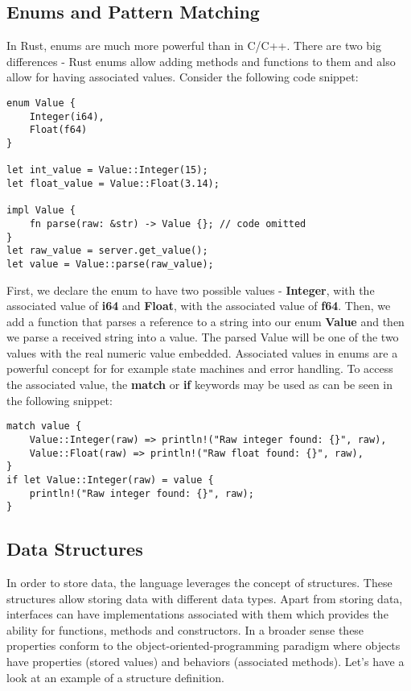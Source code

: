 \subsection{Enums and Pattern Matching}
\label{subsec:enum}
In Rust, enums are much more powerful than in C/C++.
There are two big differences - Rust enums allow adding methods and functions to them and also allow for having associated values.
Consider the following code snippet:

\begin{lstlisting}
enum Value {
    Integer(i64),
    Float(f64)
}

let int_value = Value::Integer(15);
let float_value = Value::Float(3.14);

impl Value {
    fn parse(raw: &str) -> Value {}; // code omitted
}
let raw_value = server.get_value();
let value = Value::parse(raw_value);
\end{lstlisting}

First, we declare the enum to have two possible values - \textbf{Integer}, with the associated value of \textbf{i64} and \textbf{Float}, with the associated value of \textbf{f64}.
Then, we add a function that parses a reference to a string into our enum \textbf{Value} and then we parse a received string into a value.
The parsed Value will be one of the two values with the real numeric value embedded.
Associated values in enums are a powerful concept for for example state machines and error handling.
To access the associated value, the \textbf{match} or \textbf{if} keywords may be used as can be seen in the following snippet:

\begin{lstlisting}
match value {
    Value::Integer(raw) => println!("Raw integer found: {}", raw),
    Value::Float(raw) => println!("Raw float found: {}", raw),
}
if let Value::Integer(raw) = value {
    println!("Raw integer found: {}", raw);
}
\end{lstlisting}

\subsection{Data Structures}
\label{subsec:struct}
In order to store data, the language leverages the concept of structures.
These structures allow storing data with different data types.
Apart from storing data, interfaces can have implementations associated with them which provides the ability for functions, methods and constructors.
In a broader sense these properties conform to the object-oriented-programming paradigm where objects have properties (stored values) and behaviors (associated methods).
Let's have a look at an example of a structure definition.

